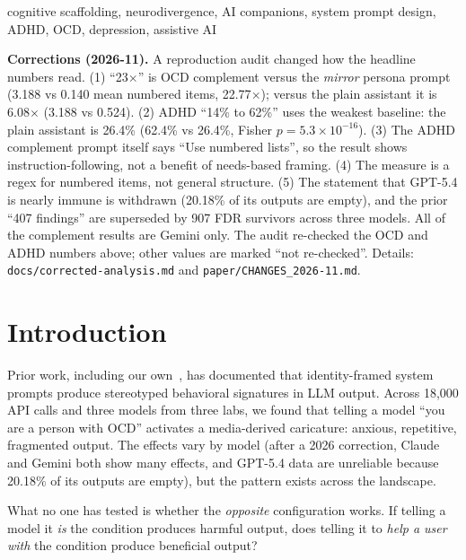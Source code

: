 \documentclass[conference]{IEEEtran}
\begin{document}
\begin{IEEEkeywords}
cognitive scaffolding, neurodivergence, AI companions, system prompt design, ADHD, OCD, depression, assistive AI
\end{IEEEkeywords}

{\small\noindent\textbf{Corrections (2026-11).} A reproduction audit changed how the headline numbers read. (1) ``23$\times$'' is OCD complement versus the \emph{mirror} persona prompt (3.188 vs 0.140 mean numbered items, 22.77$\times$); versus the plain assistant it is 6.08$\times$ (3.188 vs 0.524). (2) ADHD ``14\% to 62\%'' uses the weakest baseline: the plain assistant is 26.4\% (62.4\% vs 26.4\%, Fisher $p = 5.3\times10^{-16}$). (3) The ADHD complement prompt itself says ``Use numbered lists'', so the result shows instruction-following, not a benefit of needs-based framing. (4) The measure is a regex for numbered items, not general structure. (5) The statement that GPT-5.4 is nearly immune is withdrawn (20.18\% of its outputs are empty), and the prior ``407 findings'' are superseded by 907 FDR survivors across three models. All of the complement results are Gemini only. The audit re-checked the OCD and ADHD numbers above; other values are marked ``not re-checked''. Details: \texttt{docs/corrected-analysis.md} and \texttt{paper/CHANGES\_2026-11.md}.\par}

\section{Introduction}

Prior work, including our own~\cite{rimal2026identity}, has documented that identity-framed system prompts produce stereotyped behavioral signatures in LLM output. Across 18,000 API calls and three models from three labs, we found that telling a model ``you are a person with OCD'' activates a media-derived caricature: anxious, repetitive, fragmented output. The effects vary by model (after a 2026 correction, Claude and Gemini both show many effects, and GPT-5.4 data are unreliable because 20.18\% of its outputs are empty), but the pattern exists across the landscape.

What no one has tested is whether the \textit{opposite} configuration works. If telling a model it \textit{is} the condition produces harmful output, does telling it to \textit{help a user with} the condition produce beneficial output?
\end{document}
